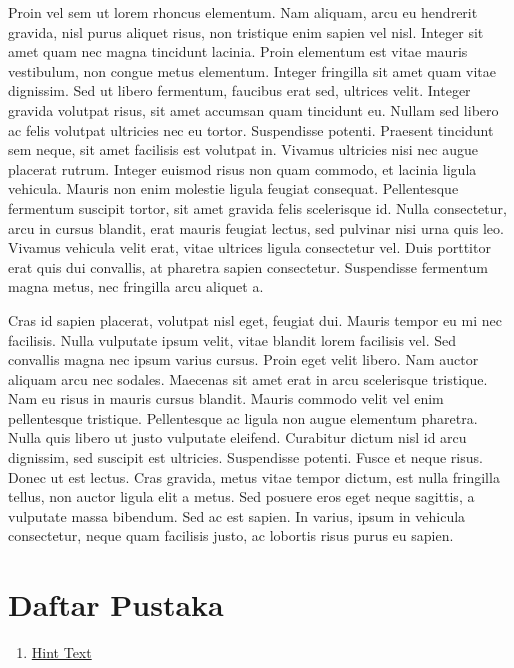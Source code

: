 \documentclass[a4paper]{article}
\newcommand{\nonumsection}[1]{\section*{#1}
\addcontentsline{toc}{section}{#1}
}
\begin{document}
Proin vel sem ut lorem rhoncus elementum. Nam aliquam, arcu eu hendrerit gravida, nisl purus aliquet risus, non tristique enim sapien vel nisl. Integer sit amet quam nec magna tincidunt lacinia. Proin elementum est vitae mauris vestibulum, non congue metus elementum. Integer fringilla sit amet quam vitae dignissim. Sed ut libero fermentum, faucibus erat sed, ultrices velit. Integer gravida volutpat risus, sit amet accumsan quam tincidunt eu. Nullam sed libero ac felis volutpat ultricies nec eu tortor. Suspendisse potenti. Praesent tincidunt sem neque, sit amet facilisis est volutpat in. Vivamus ultricies nisi nec augue placerat rutrum. Integer euismod risus non quam commodo, et lacinia ligula vehicula. Mauris non enim molestie ligula feugiat consequat. Pellentesque fermentum suscipit tortor, sit amet gravida felis scelerisque id. Nulla consectetur, arcu in cursus blandit, erat mauris feugiat lectus, sed pulvinar nisi urna quis leo. Vivamus vehicula velit erat, vitae ultrices ligula consectetur vel. Duis porttitor erat quis dui convallis, at pharetra sapien consectetur. Suspendisse fermentum magna metus, nec fringilla arcu aliquet a.

Cras id sapien placerat, volutpat nisl eget, feugiat dui. Mauris tempor eu mi nec facilisis. Nulla vulputate ipsum velit, vitae blandit lorem facilisis vel. Sed convallis magna nec ipsum varius cursus. Proin eget velit libero. Nam auctor aliquam arcu nec sodales. Maecenas sit amet erat in arcu scelerisque tristique. Nam eu risus in mauris cursus blandit. Mauris commodo velit vel enim pellentesque tristique. Pellentesque ac ligula non augue elementum pharetra. Nulla quis libero ut justo vulputate eleifend. Curabitur dictum nisl id arcu dignissim, sed suscipit est ultricies. Suspendisse potenti. Fusce et neque risus. Donec ut est lectus. Cras gravida, metus vitae tempor dictum, est nulla fringilla tellus, non auctor ligula elit a metus. Sed posuere eros eget neque sagittis, a vulputate massa bibendum. Sed ac est sapien. In varius, ipsum in vehicula consectetur, neque quam facilisis justo, ac lobortis risus purus eu sapien.
\newpage

\nonumsection{Daftar Pustaka}
\begin{enumerate}
  \item \textcolor{blue}{\href{link}{Hint Text}}

\end{enumerate}
\end{document}
